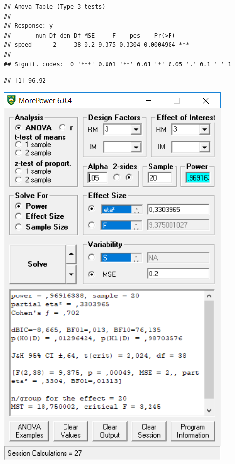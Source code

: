 \documentclass[]{book}
\newenvironment{Shaded}{\begin{snugshade}}{\end{snugshade}}
\newcommand{\CommentTok}[1]{\textcolor[rgb]{0.56,0.35,0.01}{\textit{#1}}}
\newcommand{\NormalTok}[1]{#1}
\newcommand{\OperatorTok}[1]{\textcolor[rgb]{0.81,0.36,0.00}{\textbf{#1}}}
\begin{document}
\begin{verbatim}
## Anova Table (Type 3 tests)
## 
## Response: y
##       num Df den Df MSE     F    pes    Pr(>F)    
## speed      2     38 0.2 9.375 0.3304 0.0004904 ***
## ---
## Signif. codes:  0 '***' 0.001 '**' 0.01 '*' 0.05 '.' 0.1 ' ' 1
\end{verbatim}

\begin{Shaded}
\end{Shaded}

\begin{verbatim}
## [1] 96.92
\end{verbatim}

\includegraphics{screenshots/morepower_3.png}
\end{document}
